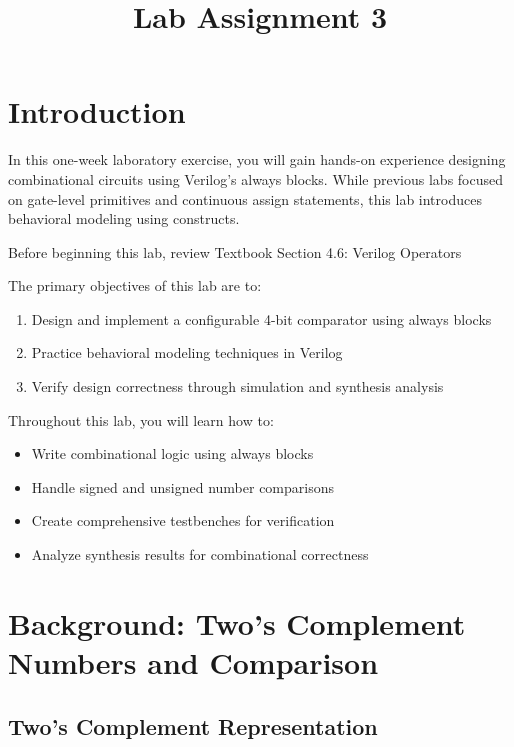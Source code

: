 \documentclass[12pt]{betterjournal}
\title{Lab Assignment 3}
\author{}
\date{}
\begin{document}
\maketitle

\section{Introduction}

In this one-week laboratory exercise, you will gain hands-on experience designing combinational circuits using Verilog's always blocks. While previous labs focused on gate-level primitives and continuous assign statements, this lab introduces behavioral modeling using  constructs.

\begin{extra}[frametitle={Required Reading}]
Before beginning this lab, review Textbook Section 4.6: Verilog Operators
\end{extra}

The primary objectives of this lab are to:
\begin{enumerate}
    \item Design and implement a configurable 4-bit comparator using always blocks
    \item Practice behavioral modeling techniques in Verilog
    \item Verify design correctness through simulation and synthesis analysis
\end{enumerate}

Throughout this lab, you will learn how to:
\begin{itemize}
    \item Write combinational logic using always blocks
    \item Handle signed and unsigned number comparisons
    \item Create comprehensive testbenches for verification
    \item Analyze synthesis results for combinational correctness
\end{itemize}

\section{Background: Two's Complement Numbers and Comparison}

\subsection{Two's Complement Representation}
\end{document}
